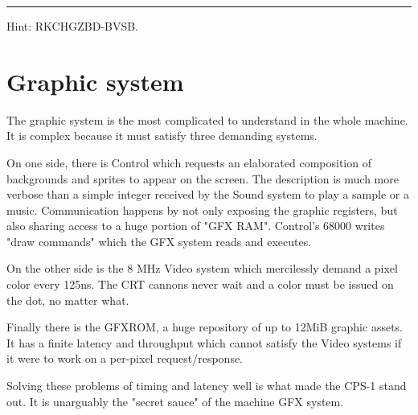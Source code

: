 

\par\noindent\rule{\textwidth}{0.5pt}





Hint: RKCHGZBD-BVSB.














\section{Graphic system}


The graphic system is the most complicated to understand in the whole machine. It is complex because it must satisfy three demanding systems.



On one side, there is Control which requests an elaborated composition of backgrounds and sprites to appear on the screen. The description is much more verbose than a simple integer received by the Sound system to play a sample or a music. Communication happens by not only exposing the graphic registers, but also sharing access to a huge portion of "GFX RAM". Control's 68000 writes "draw commands" which the GFX system reads and executes.

On the other side is the 8 MHz Video system which mercilessly demand a pixel color every 125ns. The CRT cannons never wait and a color must be issued on the dot, no matter what. 

Finally there is the GFXROM, a huge repository of up to 12MiB graphic assets. It has a finite latency and throughput which cannot satisfy the Video systems if it were to work on a per-pixel request/response.

Solving these problems of timing and latency well is what made the CPS-1 stand out. It is unarguably the "secret sauce" of the machine GFX system. 

